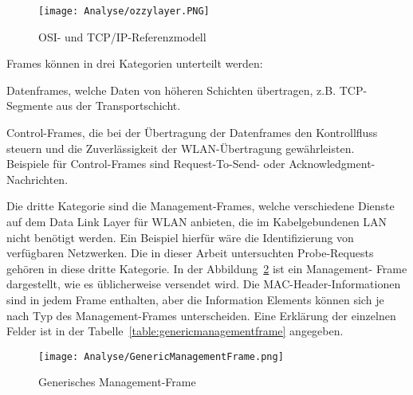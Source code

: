 \begin{figure}[h!]
	\centering
	\texttt{[image: Analyse/ozzylayer.PNG]}
	\caption{OSI- und TCP/IP-Referenzmodell
	\label{figure:ozzylayer}}
\end{figure}

\clearpage

Frames können in drei Kategorien unterteilt werden:

Datenframes, welche Daten von höheren Schichten übertragen, 
z.B. TCP-Segmente aus der Transportschicht.

Control-Frames, die bei der Übertragung der Datenframes den Kontrollfluss
steuern und die Zuverlässigkeit der WLAN-Übertragung gewährleisten. \\
Beispiele für Control-Frames sind Request-To-Send- oder Acknowledgment-
Nachrichten.

Die dritte Kategorie sind die Management-Frames, welche verschiedene
Dienste auf dem Data Link Layer für WLAN anbieten, die im Kabelgebundenen
LAN nicht benötigt werden. Ein Beispiel hierfür wäre die Identifizierung von verfügbaren 
Netzwerken.
Die in dieser Arbeit untersuchten Probe-Requests gehören in diese dritte Kategorie.
In der Abbildung~\ref{figure:genericmanagementframe} ist ein Management- 
Frame dargestellt, wie es üblicherweise versendet wird. 
Die MAC-Header-Informationen sind in jedem Frame enthalten, aber die 
Information Elements können sich je nach Typ des Management-Frames unterscheiden.
Eine Erklärung der einzelnen Felder ist in der 
Tabelle~\ref{table:genericmanagementframe} angegeben.

\begin{figure}[h!]
	\centering
	\texttt{[image: Analyse/GenericManagementFrame.png]}
	\caption{Generisches Management-Frame
	\label{figure:genericmanagementframe}}
\end{figure}

